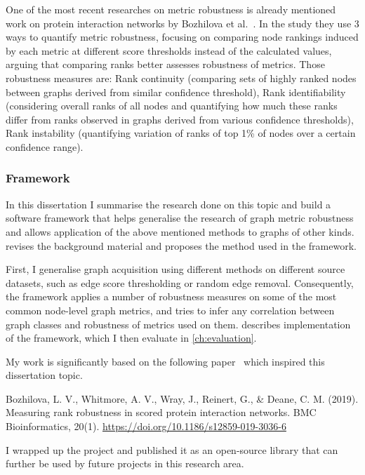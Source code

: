 One of the most recent researches on metric robustness is already mentioned work on protein interaction networks by Bozhilova et al.~\cite{Bozhilova2019}.
In the study they use 3 ways to quantify metric robustness, focusing on comparing node rankings induced by each metric at different score thresholds instead of the calculated values, arguing that comparing ranks better assesses robustness of metrics.
Those robustness measures are: Rank continuity (comparing sets of highly ranked nodes between graphs derived from similar confidence threshold), Rank identifiability (considering overall ranks of all nodes and quantifying how much these ranks differ from ranks observed in graphs derived from various confidence thresholds), Rank instability (quantifying variation of ranks of top 1\% of nodes over a certain confidence range).

\subsubsection*{Framework}


In this dissertation I summarise the research done on this topic and build a software framework that helps generalise the research of graph metric robustness and allows application of the above mentioned methods to graphs of other kinds.
 revises the background material and proposes the method used in the framework.

First, I generalise graph acquisition using different methods on different source datasets, such as edge score thresholding or random edge removal.
Consequently, the framework applies a number of robustness measures on some of the most common node-level graph metrics, and tries to infer any correlation between graph classes and robustness of metrics used on them.
 describes implementation of the framework, which I then evaluate in \cref{ch:evaluation}.


My work is significantly based on the following paper~\cite{Bozhilova2019} which inspired this dissertation topic.
\begin{adjustwidth}{1cm}{}
    \vspace*{0.5em}
    Bozhilova, L. V., Whitmore, A. V., Wray, J., Reinert, G., \& Deane, C. M. (2019). Measuring rank robustness in scored protein interaction networks. BMC Bioinformatics, 20(1). \url{https://doi.org/10.1186/s12859-019-3036-6}
    \vspace*{0.5em}
\end{adjustwidth}

I wrapped up the project and published it as an open-source library that can further be used by future projects in this research area.

